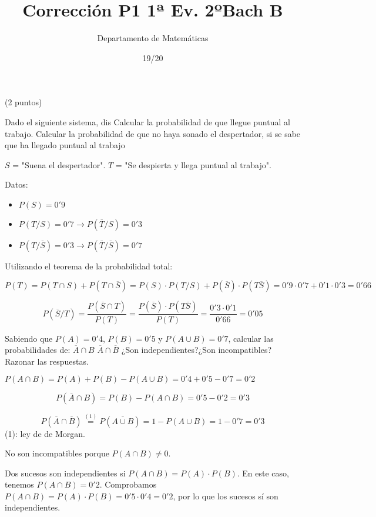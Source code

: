 \documentclass[palatino,nosec,nochap,nobuilddate]{Docencia}
\title{Corrección P1 1ª Ev. 2ºBach B}
\author{Departamento de Matemáticas}
\date{19/20}
\newcommand\BackgroundPic{%
\put(0,0){%
\parbox[b][\paperheight]{\paperwidth}{%
\vfill
\centering
\texttt{[image: ../../../../BWLogo.jpeg]}%
\vfill
}}}
\begin{document}
\pagestyle{plain}
\maketitle


\newpage
\begin{problem}(2 puntos)

Dado el siguiente sistema, dis
\ppart Calcular la probabilidad de que llegue puntual al trabajo.
\ppart Calcular la probabilidad de que no haya sonado el despertador, si se sabe que ha llegado puntual al trabajo
\solution

$S$ = "Suena el despertador". \;\;\;\; $T$ = "Se despierta y llega puntual al trabajo". 

Datos:
\begin{itemize}
	\item $P(S) = 0'9$
	\item $P(T/S) = 0'7 \to P(\overline{T}/S) = 0'3$ 
	\item $P(T/\overline{S}) = 0'3 \to P(\overline{T}/\overline{S}) = 0'7$
\end{itemize}
\spart
Utilizando el teorema de la probabilidad total:

\[P(T) = P(T\cap S) + P(T\cap \overline{S}) = P(S)·P(T/S) + P(\overline{S})·P(T\overline{S}) = 0'9·0'7 + 0'1·0'3 = 0'66\]

\spart

\[P(\overline{S}/T) = \frac{P(\overline{S}\cap T)}{P(T)} = \frac{P(\overline{S})·P(T\overline{S})}{P(T)} =\frac{0'3·0'1}{0'66} = 0'05\]

\end{problem}

\begin{problem}
Sabiendo que $P(A) = 0'4$, $P(B) = 0'5$ y $P(A\cup B) = 0'7$, calcular las probabilidades de:
\ppart $\overline{A}\cap B$
\ppart $\overline{A}\cap\overline{B}$
\ppart ¿Son independientes?¿Son incompatibles? Razonar las respuestas.

\solution

$P(A\cap B) = P(A) + P(B) - P(A\cup B) = 0'4+0'5-0'7 = 0'2$

\spart \[P(\overline{A}\cap B) = P(B) - P(A\cap B) = 0'5-0'2 = 0'3\]

\spart \[P(\overline{A}\cap\overline{B}) \overset{(1)}{=} P\left(\overline{A\cup B}\right) = 1 - P(A\cup B) = 1-0'7 = 0'3 \]
(1): ley de de Morgan.

\spart 
No son incompatibles porque $P(A\cap B) \neq 0$.

Dos sucesos son independientes si $P(A\cap B) = P(A)·P(B)$. En este caso, tenemos $P(A\cap B) = 0'2$. Comprobamos $P(A\cap B) = P(A)·P(B) = 0'5·0'4 = 0'2$, por lo que los sucesos sí son independientes.

\end{problem}
\end{document}
